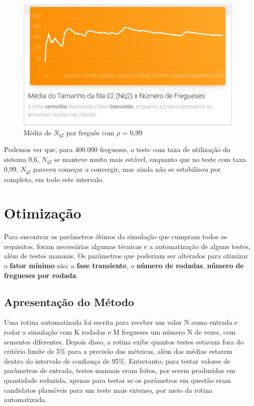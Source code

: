 \documentclass[a4paper,12pt]{report}
\begin{document}
\begin{figure}[H]
\includegraphics[width=1\textwidth]{./graficos/rho099compara.png}
\vspace{-10mm}
\caption{Média de $N_{q2}$ por freguês com $\rho$ = 0,99}
\end{figure}

Podemos ver que, para 400.000 fregueses, o teste com taxa de utilização do sistema 0,6, $N_{q2}$ se manteve muito mais estável, enquanto que no teste com taxa 0,99, $N_{q2}$ pareceu começar a convergir, mas ainda não se estabilizou por completo, em todo este intervalo.


\chapter{Otimização}

Para encontrar os parâmetros ótimos da simulação que cumpram todos os requisitos, foram necessárias algumas técnicas e a automatização de alguns testes, além de testes manuais. Os parâmetros que poderiam ser alterados para otimizar o \textbf{fator mínimo} são: a \textbf{fase transiente}, o \textbf{número de rodadas}, \textbf{número de fregueses por rodada}.

\section{Apresentação do Método}

Uma rotina automatizada foi escrita para receber um valor N como entrada e rodar a simulação com K rodadas e M fregueses um número N de vezes, com sementes diferentes. Depois disso, a rotina exibe quantos testes estavam fora do critério limite de 5\% para a precisão das métricas, além das médias estarem dentro do intervalo de confiança de 95\%. Entretanto, para testar valores de parâmetros de entrada, testes manuais eram feitos, por serem produzidos em quantidade reduzida, apenas para testar se os parâmetros em questão eram candidatos plausíveis para um teste mais extenso, por meio da rotina automatizada.
\end{document}
